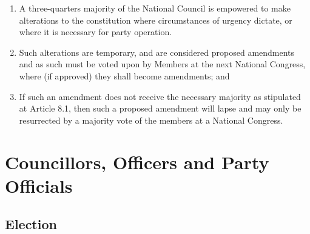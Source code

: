 \documentclass[a4paper,titlepage,8.5pt]{article}
\begin{document}
\begin{enumerate}
\item A three-quarters majority of the National Council is empowered to make alterations to the constitution where circumstances of urgency dictate, or where it is necessary for party operation.
\item Such alterations are temporary, and are considered proposed amendments and as such must be voted upon by Members at the next National Congress, where (if approved) they shall become amendments; and
\item If such an amendment does not receive the necessary majority as stipulated at Article 8.1, then such a proposed amendment will lapse and may only be resurrected by a majority vote of the members at a National Congress.
\end{enumerate}

\section{Councillors, Officers and Party Officials}

\subsection{Election}
\end{document}
